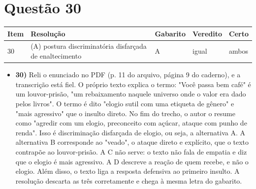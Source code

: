 \documentclass{article}%
\begin{document}
\section*{Questão 30}%
\begin{longtable}{@{}p{} p{} p{} p{} p{}@{}}\toprule Item & Resolução & Gabarito & Veredito & Certo \\ \midrule
30 & (A) postura discriminatória disfarçada de enaltecimento & A & igual & ambos \\
\bottomrule\end{longtable}%
\begin{itemize}%
\item%
\textbf{30)} Reli o enunciado no PDF (p. 11 do arquivo, página 9 do caderno), e a transcrição está fiel. O próprio texto explica o termo: "Você passa bem café" é um louvor{-}prisão, "um rebaixamento naquele universo onde o valor era dado pelos livros". O termo é dito "elogio sutil com uma etiqueta de gênero" e "mais agressivo" que o insulto direto. No fim do trecho, o autor o resume como "agredir com um elogio, preconceito com açúcar, ataque com punho de renda". Isso é discriminação disfarçada de elogio, ou seja, a alternativa A. A alternativa B corresponde ao "veado", o ataque direto e explícito, que o texto contrapõe ao louvor{-}prisão. A C não serve: o texto não fala de empatia e diz que o elogio é mais agressivo. A D descreve a reação de quem recebe, e não o elogio. Além disso, o texto liga a resposta defensiva ao primeiro insulto. A resolução descarta as três corretamente e chega à mesma letra do gabarito.%
\end{itemize}%
\end{document}
